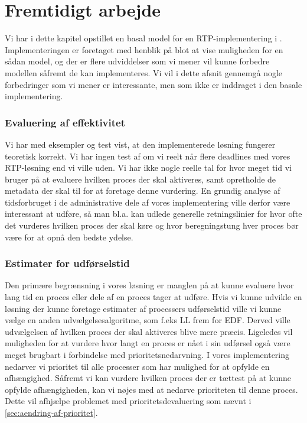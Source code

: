 \section{Fremtidigt arbejde}\label{sec:deadlineFuture}
Vi har i dette kapitel opstillet en basal model for en RTP-implementering i \pycsp. Implementeringen er foretaget med henblik på blot at vise muligheden for en sådan model, og der er flere udviddelser som vi mener vil kunne forbedre modellen såfremt de kan implementeres. Vi vil i dette afsnit gennemgå nogle forbedringer som vi mener er interessante, men som ikke er inddraget i den basale implementering. 

\subsubsection{Evaluering af effektivitet}
Vi har med eksempler og test vist, at den implementerede løsning fungerer teoretisk korrekt. Vi har ingen test af om vi reelt når flere deadlines med vores RTP-løsning end vi ville uden. Vi har ikke nogle reelle tal for hvor meget tid vi bruger på at evaluere hvilken proces der skal aktiveres, samt opretholde de metadata der skal til for at foretage denne vurdering. En grundig analyse af tidsforbruget i de administrative dele af vores implementering ville derfor være interessant at udføre, så man bl.a. kan udlede generelle retningslinier for hvor ofte det vurderes hvilken proces der skal køre og hvor beregningstung hver proces bør være for at opnå den bedste ydelse. 

\subsubsection{Estimater for udførselstid}
Den primære begrænsning i vores løsning er manglen på at kunne evaluere hvor lang tid en proces eller dele af en proces tager at udføre. Hvis vi kunne udvikle en løsning der kunne foretage estimater af processers udførselstid ville vi kunne vælge en anden udvælgelsesalgoritme, som f.eks LL frem for EDF. Derved ville udvælgelsen af hvilken proces der skal aktiveres blive mere præcis. Ligeledes vil muligheden for at vurdere hvor langt en proces er nået i sin udførsel også være meget brugbart i forbindelse med prioritetsnedarvning. I vores implementering nedarver vi prioritet til alle processer som har mulighed for at opfylde en afhængighed. Såfremt vi kan vurdere hvilken proces der er tættest på at kunne opfylde afhængigheden, kan vi nøjes med at nedarve prioriteten til denne proces. Dette vil afhjælpe problemet med prioritetsdevaluering som nævnt i \cref{sec:aendring-af-prioritet}.

